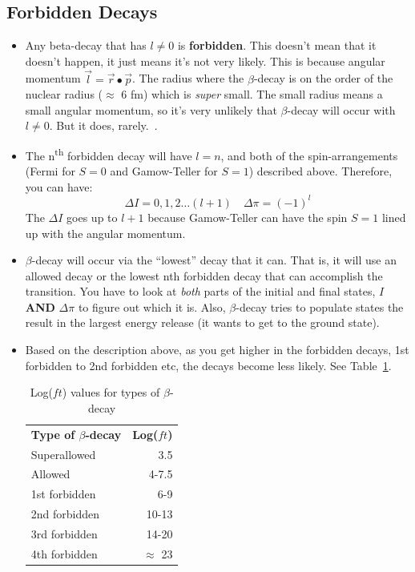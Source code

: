 \documentclass[letter]{article}
\begin{document}
\subsection{Forbidden Decays}

\begin{itemize}
\item Any beta-decay that has $l \neq 0$ is \textbf{forbidden}. This
  doesn't mean that it doesn't happen, it just means it's not very
  likely. This is because angular momentum $\vec{l} =
  \vec{r}\bullet\vec{p}$. The radius where the $\beta$-decay is on the
  order of the nuclear radius ($\approx$ 6 fm) which is \textit{super}
  small. The small radius means a small angular momentum, so it's very
  unlikely that $\beta$-decay will occur with $l \neq 0$. But it does,
  rarely.~\cite[Lec. 19-21]{lecture}.
\item The n\textsuperscript{th} forbidden decay will have $l=n$, and both of the
  spin-arrangements (Fermi for $S=0$ and Gamow-Teller for $S=1$)
  described above. Therefore, you can have:
  \begin{equation*}
    \Delta{}I=0,1,2\ldots(l+1) \quad \Delta\pi = (-1)^l
  \end{equation*}
The $\Delta{}I$ goes up to $l+1$ because Gamow-Teller can have the
spin $S=1$ lined up with the angular
momentum.~\cite[pp.291,Lec.19-21]{krane,lecture}
\item $\beta$-decay will occur via the ``lowest'' decay that it
  can. That is, it will use an allowed decay or the lowest nth
  forbidden decay that can accomplish the transition. You have to look
  at \textit{both} parts of the initial and final states, $I$
  \textbf{AND} $\Delta\pi$ to figure out which it is. Also,
  $\beta$-decay tries to populate states the result in the largest
  energy release (it wants to get to the ground state).~\cite[Lec 19-21]{lecture}
\item Based on the description above, as you get higher in the
  forbidden decays, 1st forbidden to 2nd forbidden etc, the decays
  become less likely. See Table~\ref{tab:logft}.~\cite[Lec. 19-21]{lecture}
\begin{table}[hbt]
\centering
\begin{tabular}{lr}
\textbf{Type of $\beta$-decay} & \textbf{Log($ft$)} \\
Superallowed                   & 3.5                \\
Allowed                        & 4-7.5              \\
1st forbidden                  & 6-9                \\
2nd forbidden                  & 10-13              \\
3rd forbidden                  & 14-20              \\
4th forbidden                  & $\approx$ 23
\end{tabular}
\caption{Log($ft$) values for types of $\beta$-decay}
\label{tab:logft}
\end{table}
\end{itemize}
\end{document}
